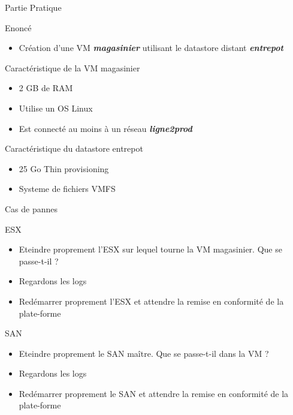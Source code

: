 \documentclass[10pt]{beamer}
\begin{document}
\begin{frame}{Partie Pratique}
\begin{block}{Enoncé}
\begin{itemize}
\item Création d'une VM \textit{\textbf{magasinier}} utilisant le datastore distant \textbf{\textit{entrepot}}
\end{itemize}
\end{block}
\begin{block}{Caractéristique de la VM magasinier}
\begin{itemize}
\item 2 GB de RAM
\item Utilise un OS Linux
\item Est connecté au moins à un réseau \textbf{\textit{ligne2prod}}
\end{itemize}
\end{block}
\begin{block}{Caractéristique du datastore entrepot}
\begin{itemize}
\item 25 Go Thin provisioning
\item Systeme de fichiers VMFS
\end{itemize}
\end{block}
\end{frame}

\begin{frame}{Cas de pannes}
\begin{block}{ESX}
\begin{itemize}
\item Eteindre proprement l'ESX sur lequel tourne la VM magasinier. Que se passe-t-il ?
\item Regardons les logs
\item Redémarrer proprement l'ESX et attendre la remise en conformité de la plate-forme
\end{itemize}
\end{block}

\begin{block}{SAN}
\begin{itemize}
\item Eteindre proprement le SAN maître. Que se passe-t-il dans la VM ?
\item Regardons les logs
\item Redémarrer proprement le SAN et attendre la remise en conformité de la plate-forme
\end{itemize}
\end{block}
\end{frame}
\end{document}
